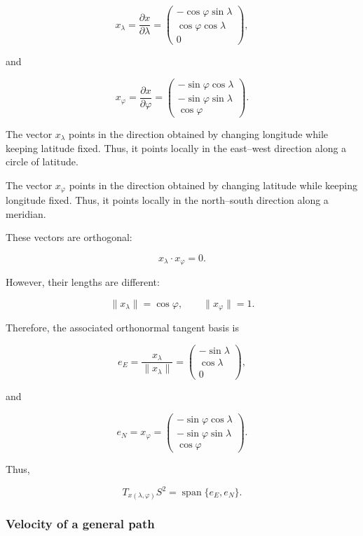 \documentclass[12pt,a4paper]{article}
\theoremstyle{notespace}
\begin{document}
\[
x_\lambda
=
\frac{\partial x}{\partial\lambda}
=
\begin{pmatrix}
	-\cos\varphi\sin\lambda\\
	\cos\varphi\cos\lambda\\
	0
\end{pmatrix},
\]

and

\[
x_\varphi
=
\frac{\partial x}{\partial\varphi}
=
\begin{pmatrix}
	-\sin\varphi\cos\lambda\\
	-\sin\varphi\sin\lambda\\
	\cos\varphi
\end{pmatrix}.
\]

The vector \(x_\lambda\) points in the direction obtained by changing
longitude while keeping latitude fixed. Thus, it points locally in the
east--west direction along a circle of latitude.

The vector \(x_\varphi\) points in the direction obtained by changing
latitude while keeping longitude fixed. Thus, it points locally in the
north--south direction along a meridian.

These vectors are orthogonal:

\[
x_\lambda\cdot x_\varphi=0.
\]

However, their lengths are different:

\[
\|x_\lambda\|=\cos\varphi,
\qquad
\|x_\varphi\|=1.
\]

Therefore, the associated orthonormal tangent basis is

\[
\boxed{
	e_E
	=
	\frac{x_\lambda}{\|x_\lambda\|}
	=
	\begin{pmatrix}
		-\sin\lambda\\
		\cos\lambda\\
		0
	\end{pmatrix},
}
\]

and

\[
\boxed{
	e_N
	=
	x_\varphi
	=
	\begin{pmatrix}
		-\sin\varphi\cos\lambda\\
		-\sin\varphi\sin\lambda\\
		\cos\varphi
	\end{pmatrix}.
}
\]

Thus,

\[
\boxed{
	T_{x(\lambda,\varphi)}S^2
	=
	\operatorname{span}\{e_E,e_N\}.
}
\]

\subsubsection{Velocity of a general path}
\end{document}
